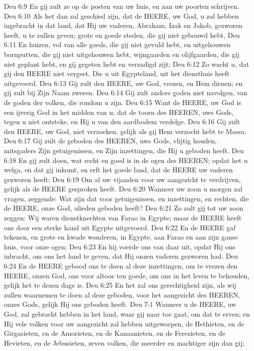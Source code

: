 Deu 6:9  En gij zult ze op de posten van uw huis, en aan uw poorten schrijven.
Deu 6:10  Als het dan zal geschied zijn, dat de HEERE, uw God, u zal hebben ingebracht in dat land, dat Hij uw vaderen, Abraham, Izak en Jakob, gezworen heeft, u te zullen geven; grote en goede steden, die gij niet gebouwd hebt,
Deu 6:11  En huizen, vol van alle goeds, die gij niet gevuld hebt, en uitgehouwen bornputten, die gij niet uitgehouwen hebt, wijngaarden en olijfgaarden, die gij niet geplant hebt, en gij gegeten hebt en verzadigd zijt;
Deu 6:12  Zo wacht u, dat gij den HEERE niet vergeet, Die u uit Egypteland, uit het diensthuis heeft uitgevoerd.
Deu 6:13  Gij zult den HEERE, uw God, vrezen, en Hem dienen; en gij zult bij Zijn Naam zweren.
Deu 6:14  Gij zult andere goden niet navolgen, van de goden der volken, die rondom u zijn.
Deu 6:15  Want de HEERE, uw God is een ijverig God in het midden van u; dat de toorn des HEEREN, uws Gods, tegen u niet ontsteke, en Hij u van den aardbodem verdelge.
Deu 6:16  Gij zult den HEERE, uw God, niet verzoeken, gelijk als gij Hem verzocht hebt te Massa.
Deu 6:17  Gij zult de geboden des HEEREN, uws Gods, vlijtig houden, mitsgaders Zijn getuigenissen, en Zijn inzettingen, die Hij u geboden heeft.
Deu 6:18  En gij zult doen, wat recht en goed is in de ogen des HEEREN; opdat het u welga, en dat gij inkomt, en erft het goede land, dat de HEERE uw vaderen gezworen heeft;
Deu 6:19  Om al uw vijanden voor uw aangezicht te verdrijven, gelijk als de HEERE gesproken heeft.
Deu 6:20  Wanneer uw zoon u morgen zal vragen, zeggende: Wat zijn dat voor getuigenissen, en inzettingen, en rechten, die de HEERE, onze God, ulieden geboden heeft?
Deu 6:21  Zo zult gij tot uw zoon zeggen: Wij waren dienstknechten van Farao in Egypte; maar de HEERE heeft ons door een sterke hand uit Egypte uitgevoerd.
Deu 6:22  En de HEERE gaf tekenen, en grote en kwade wonderen, in Egypte, aan Farao en aan zijn ganse huis, voor onze ogen;
Deu 6:23  En hij voerde ons van daar uit, opdat Hij ons inbracht, om ons het land te geven, dat Hij onzen vaderen gezworen had.
Deu 6:24  En de HEERE gebood ons te doen al deze inzettingen, om te vrezen den HEERE, onzen God, ons voor altoos ten goede, om ons in het leven te behouden, gelijk het te dezen dage is.
Deu 6:25  En het zal ons gerechtigheid zijn, als wij zullen waarnemen te doen al deze geboden, voor het aangezicht des HEEREN, onzes Gods, gelijk Hij ons geboden heeft.
Deu 7:1  Wanneer u de HEERE, uw God, zal gebracht hebben in het land, waar gij naar toe gaat, om dat te erven; en Hij vele volken voor uw aangezicht zal hebben uitgeworpen, de Hethieten, en de Girgasieten, en de Amorieten, en de Kanaanieten, en de Ferezieten, en de Hevieten, en de Jebusieten, zeven volken, die meerder en machtiger zijn dan gij;
